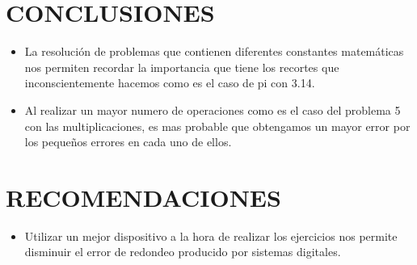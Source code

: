 \documentclass[12pt]{article}
\begin{document}
\section*{CONCLUSIONES}
\begin{itemize}
    \item La resolución de problemas que contienen diferentes constantes matemáticas nos permiten recordar la importancia que tiene los recortes que inconscientemente hacemos como es el caso de pi con 3.14. 
    \item Al realizar un mayor numero de operaciones como es el caso del problema 5 con las multiplicaciones, es mas probable que obtengamos un mayor error por los pequeños errores en cada uno de ellos. 
\end{itemize}
\vspace{0.5cm}
\section*{RECOMENDACIONES}
\begin{itemize}
    \item Utilizar un mejor dispositivo a la hora de realizar los ejercicios nos permite disminuir el error de redondeo producido por sistemas digitales.
   
\end{itemize}

\vspace{0.5cm}


\renewcommand{\refname}{\MakeUppercase{REFERENCIAS}}


\end{document}
